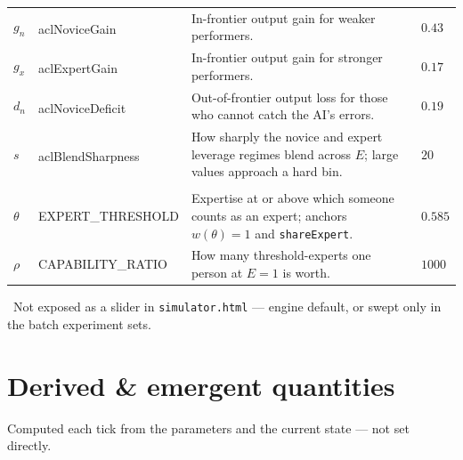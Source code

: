 \documentclass[11pt]{article}
\newcommand{\dg}{\textsuperscript{\dag}}
\begin{document}
\begin{longtable}{L{1.6cm} K{3.8cm} L{6.9cm} S{3.2cm}}
$g_n$ & aclNoviceGain\dg & In-frontier output gain for weaker performers.
  & $0.43$ \\
$g_x$ & aclExpertGain\dg & In-frontier output gain for stronger performers.
  & $0.17$ \\
$d_n$ & aclNoviceDeficit\dg & Out-of-frontier output loss for those who cannot
  catch the AI's errors.
  & $0.19$ \\
$s$ & aclBlendSharpness\dg & How sharply the novice and expert leverage regimes
  blend across $E$; large values approach a hard bin.
  & $20$ \\
\addlinespace
{}\\[2pt]
$\theta$ & EXPERT\_THRESHOLD & Expertise at or above which someone counts as an
  expert; anchors $w(\theta) = 1$ and \texttt{shareExpert}.
  & $0.585$ \\
$\rho$ & CAPABILITY\_RATIO & How many threshold-experts one person at $E = 1$ is
  worth.
  & $1000$ \\
\end{longtable}

\normalsize
{\footnotesize\noindent\dag\ Not exposed as a slider in \texttt{simulator.html}
--- engine default, or swept only in the batch experiment sets.\par}

\section*{Derived \& emergent quantities}

\noindent Computed each tick from the parameters and the current state --- not
set directly.
\end{document}
